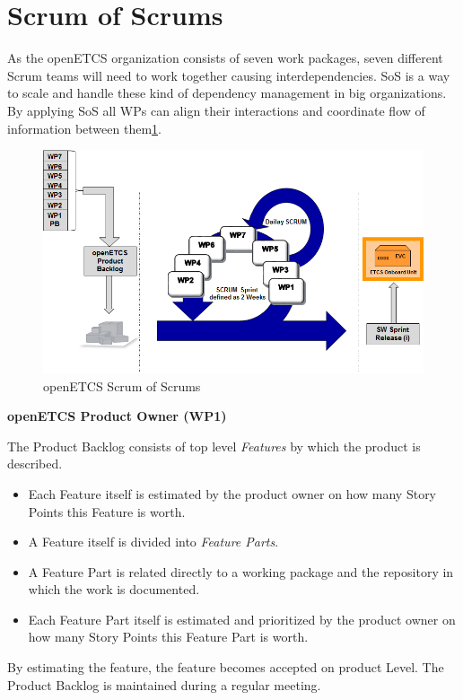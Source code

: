 \section{Scrum of Scrums}

As the openETCS organization consists of seven work packages, seven different Scrum teams will need to work together causing interdependencies. SoS is a way to scale and handle  these kind of dependency management in big organizations. By applying SoS all WPs can align their interactions and coordinate flow of information between them\ref{fig:openETCSWPinSprint}.


\begin{figure}[h]
	\centering
	\includegraphics[width=0.95\linewidth]{images/openETCS_WPs_in_SCRUMsprint}
	\caption{openETCS Scrum of Scrums}
	\label{fig:openETCSWPinSprint}
\end{figure}
	

\textbf{openETCS Product Owner (WP1)}

The Product Backlog consists of top level \textit{Features} by which the product is described.
\begin{itemize}
\item  Each Feature itself is estimated by the product owner on how many Story Points this Feature is worth.
\item  A Feature itself is divided into \textit{Feature Parts}.
\item  A Feature Part is related directly to a working package and the repository in which the work is documented.
\item  Each Feature Part itself is estimated and prioritized by the product owner on how many Story Points this Feature Part is worth.
\end{itemize}


By estimating the feature, the feature becomes accepted on product Level.
The Product Backlog is maintained during a regular meeting.

